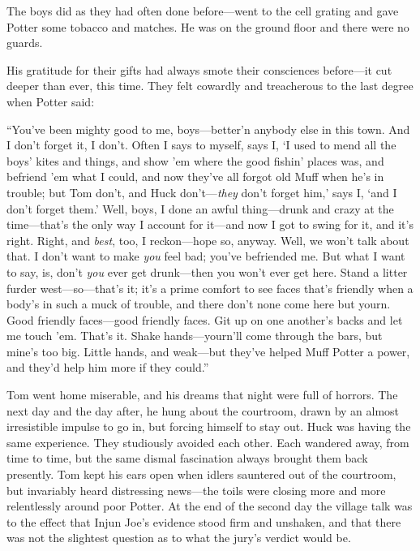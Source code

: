 \documentclass{book}
\begin{document}
The boys did as they had often done before—went to the cell grating and gave Potter some tobacco and matches. He was on the ground floor and there were no guards.

His gratitude for their gifts had always smote their consciences before—it cut deeper than ever, this time. They felt cowardly and treacherous to the last degree when Potter said:

“You’ve been mighty good to me, boys—better’n anybody else in this town. And I don’t forget it, I don’t. Often I says to myself, says I, ‘I used to mend all the boys’ kites and things, and show ’em where the good fishin’ places was, and befriend ’em what I could, and now they’ve all forgot old Muff when he’s in trouble; but Tom don’t, and Huck don’t—\emph{they} don’t forget him,’ says I, ‘and I don’t forget them.’ Well, boys, I done an awful thing—drunk and crazy at the time—that’s the only way I account for it—and now I got to swing for it, and it’s right. Right, and \emph{best}, too, I reckon—hope so, anyway. Well, we won’t talk about that. I don’t want to make \emph{you} feel bad; you’ve befriended me. But what I want to say, is, don’t \emph{you} ever get drunk—then you won’t ever get here. Stand a litter furder west—so—that’s it; it’s a prime comfort to see faces that’s friendly when a body’s in such a muck of trouble, and there don’t none come here but yourn. Good friendly faces—good friendly faces. Git up on one another’s backs and let me touch ’em. That’s it. Shake hands—yourn’ll come through the bars, but mine’s too big. Little hands, and weak—but they’ve helped Muff Potter a power, and they’d help him more if they could.”

Tom went home miserable, and his dreams that night were full of horrors. The next day and the day after, he hung about the courtroom, drawn by an almost irresistible impulse to go in, but forcing himself to stay out. Huck was having the same experience. They studiously avoided each other. Each wandered away, from time to time, but the same dismal fascination always brought them back presently. Tom kept his ears open when idlers sauntered out of the courtroom, but invariably heard distressing news—the toils were closing more and more relentlessly around poor Potter. At the end of the second day the village talk was to the effect that Injun Joe’s evidence stood firm and unshaken, and that there was not the slightest question as to what the jury’s verdict would be.
\end{document}
